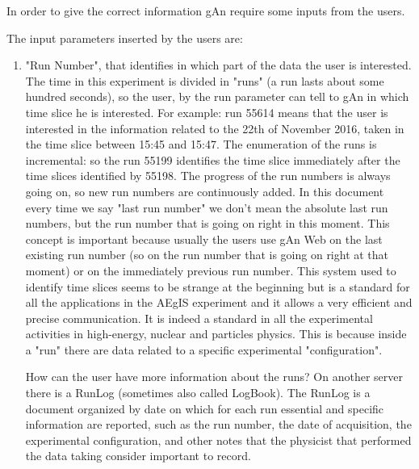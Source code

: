 In order to give the correct information gAn require some inputs from the users.

The input parameters inserted by the users are:
\begin{enumerate}

\item "Run Number", that identifies in which part of the data the user is interested. 
The time in this experiment is divided in "runs" (a run lasts about some hundred seconds), so the user, by the run parameter can tell to gAn in which time slice he is interested. For example: run 55614 means that the user is interested in the information related to the 22th of November 2016, taken in the time slice between 15:45 and 15:47. 
The enumeration of the runs is incremental: so the run 55199 identifies the time slice immediately after the time slices identified by 55198. The progress of the run numbers is always going on, so new run numbers are continuously added. 
In this document every time we say "last run number" we don't mean the absolute last run numbers, but the run number that is going on right in this moment. This concept is important because usually the users use gAn Web on the last existing run number (so on the run number that is going on right at that moment) or on the immediately previous run number.  
This system used to identify time slices seems to be strange at the beginning but is a standard for all the applications in the AEgIS experiment and it allows a very efficient and precise communication. It is indeed a standard in all the experimental activities in high-energy, nuclear and particles physics. This is because inside a "run" there are data related to a specific experimental "configuration".

How can the user have more information about the runs? 
On another server there is a RunLog (sometimes also called LogBook). The RunLog is a document organized by date on which for each run essential and specific information are reported, such as the run number, the date of acquisition, the experimental configuration, and other notes that the physicist that performed the data taking consider important to record.



\end{enumerate}
